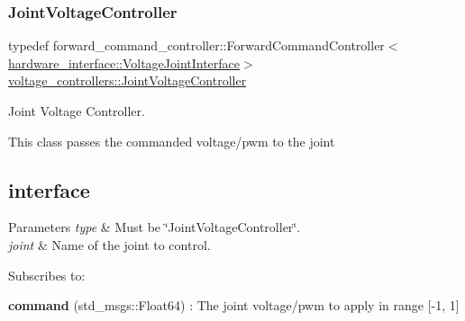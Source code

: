 \subsubsection{\texorpdfstring{Joint\+Voltage\+Controller}{JointVoltageController}}
{\footnotesize\ttfamily typedef forward\+\_\+command\+\_\+controller\+::\+Forward\+Command\+Controller$<$\hyperlink{classhardware__interface_1_1_voltage_joint_interface}{hardware\+\_\+interface\+::\+Voltage\+Joint\+Interface}$>$ \hyperlink{namespacevoltage__controllers_a342a187a35760323139ce1cad77898a6}{voltage\+\_\+controllers\+::\+Joint\+Voltage\+Controller}}



Joint Voltage Controller. 

This class passes the commanded voltage/pwm to the joint\hypertarget{namespacevoltage__controllers_ROS}{}\subsection{interface}\label{namespacevoltage__controllers_ROS}

\begin{DoxyParams}{Parameters}
{\em type} & Must be \char`\"{}\+Joint\+Voltage\+Controller\char`\"{}. \\
\hline
{\em joint} & Name of the joint to control.\\
\hline
\end{DoxyParams}
Subscribes to\+:
\begin{DoxyItemize}
\item {\bfseries command} (std\+\_\+msgs\+::\+Float64) \+: The joint voltage/pwm to apply in range \mbox{[}-\/1, 1\mbox{]} 
\end{DoxyItemize}